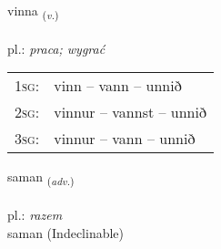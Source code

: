 \documentclass[frontgrid, backgrid]{flacards}\usepackage[]{graphicx}\usepackage[]{xcolor}
\begin{document}
\renewcommand{\blhead}{\vskip5pt {\small\bfseries\footnotesize Sagnorð | czasownik }}
\renewcommand{\bcfoot}{\vskip5pt \hspace{2pt}{\small\bfseries\footnotesize 1K}}


{vinna \small{\textsubscript{(\textit{v.})}} \\[1ex] %
\textphonetic{[vɪna]} \\
pl.: \emph{praca; wygrać} \\  [2ex]
\renewcommand*{\arraystretch}{0.8}
\begin{tabular}{p{1cm}l}
\textsc{1sg}: & vinn -- vann -- unnið \\ 
\textsc{2sg}: & vinnur -- vannst -- unnið \\ 
\textsc{3sg}: & vinnur -- vann -- unnið \\ 
\end{tabular}
}


\renewcommand{\flhead}{\vskip5pt \fboxsep=0pt {\small\bfseries\footnotesize Atviksorð | przysłówek}}
\renewcommand{\fcfoot}{\vskip5pt \fboxsep=0pt \hspace{2pt}{\small\bfseries\footnotesize 1K}}

\renewcommand{\blhead}{\vskip5pt {\small\bfseries\footnotesize Atviksorð | przysłówek }}
\renewcommand{\bcfoot}{\vskip5pt \hspace{2pt}{\small\bfseries\footnotesize 1K}}


{saman \small{\textsubscript{(\textit{adv.})}} \\[1ex]
\textphonetic{[saːman]} \\
pl.: \emph{razem} \\  [2ex]
saman (Indeclinable)}

\renewcommand{\flhead}{\vskip5pt \fboxsep=0pt {\small\bfseries\footnotesize Sagnorð | czasownik}}
\renewcommand{\fcfoot}{\vskip5pt \fboxsep=0pt \hspace{2pt}{\small\bfseries\footnotesize 1K}}

\renewcommand{\blhead}{\vskip5pt {\small\bfseries\footnotesize Sagnorð | czasownik }}
\renewcommand{\bcfoot}{\vskip5pt \hspace{2pt}{\small\bfseries\footnotesize 1K}}
\end{document}

